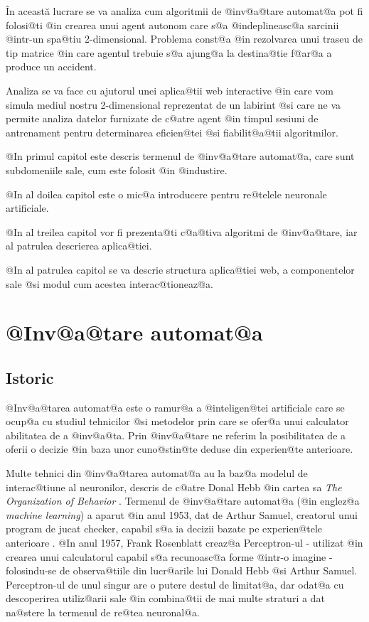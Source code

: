 \^ In aceast\u a lucrare se va analiza cum algoritmii de @inv@a@tare automat@a  pot fi folosi@ti @in crearea unui agent autonom care s@a @indeplineasc@a sarcinii @intr-un spa@tiu 2-dimensional. Problema const@a @in rezolvarea unui traseu de tip matrice @in care agentul trebuie s@a ajung@a la destina@tie f@ar@a a produce un accident.

Analiza se va face cu ajutorul unei aplica@tii web interactive @in care vom simula mediul nostru 2-dimensional reprezentat de un labirint @si care ne va permite analiza datelor furnizate de c@atre agent @in timpul sesiuni de antrenament pentru determinarea eficien@tei @si fiabilit@a@tii algoritmilor.


\hspace{0.2cm}

@In primul capitol este descris termenul de @inv@a@tare automat@a, care sunt subdomeniile sale, cum este folosit @in @industire. 

@In al doilea capitol este o mic@a introducere pentru re@telele neuronale artificiale.

@In al treilea capitol vor fi prezenta@ti c@a@tiva algoritmi de @inv@a@tare, iar al patrulea descrierea aplica@tiei.

@In al patrulea capitol se va descrie structura aplica@tiei web, a componentelor sale @si modul cum acestea interac@tioneaz@a.

\newpage

\chapter{ @Inv@a@tare automat@a }

\section{Istoric}

	@Inv@a@tarea automat@a este o ramur@a a @inteligen@tei artificiale care se ocup@a cu studiul tehnicilor @si metodelor prin care se ofer@a unui calculator abilitatea de a @inv@a@ta. Prin @inv@a@tare ne referim la posibilitatea de a oferii o decizie @in baza unor cuno@stin@te deduse din experien@te anterioare.

 Multe tehnici din @inv@a@tarea automat@a au la baz@a modelul de interac@tiune al neuronilor, descris de c@atre Donal Hebb @in cartea sa {\sl The Organization of Behavior} \cite{donald-hebb-book}. Termenul de @inv@a@tare automat@a (@in englez@a {\sl machine learning}) a aparut @in anul 1953, dat de Arthur Samuel, creatorul unui program de jucat checker, capabil s@a ia decizii bazate pe experien@tele anterioare \cite{arthur-samuel}. @In anul 1957, Frank Rosenblatt creaz@a Perceptron-ul - utilizat @in crearea unui calculatorul capabil s@a recunoasc@a forme @intr-o imagine - folosindu-se de observa@tiile din lucr@arile lui Donald Hebb @si Arthur Samuel. Perceptron-ul de unul singur are o putere destul de limitat@a, dar odat@a cu descoperirea utiliz@arii sale @in combina@tii de mai multe straturi a dat na@stere la termenul de re@tea neuronal@a. 
 
